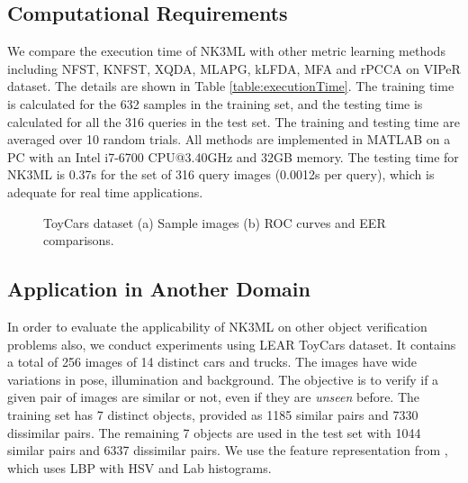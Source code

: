 \documentclass[runningheads]{llncs}
\begin{document}
\subsection{Computational Requirements}

We compare the execution time of
NK3ML with other metric learning methods including NFST\cite{Zheng:nfst}, KNFST\cite{Zheng:nfst}, XQDA\cite{LOMO,GOG},  MLAPG\cite{MLAPG}, kLFDA\cite{rPcca}, MFA\cite{rPcca} and rPCCA\cite{rPcca}  on VIPeR dataset. The details are shown in Table \ref{table:executionTime}. The training time is calculated for the 632 samples in the training set, and the testing time is calculated for all the 316 queries in the test set. The training and testing time are averaged over 10 random trials. All methods are implemented in MATLAB
on a PC with an Intel i7-6700 CPU@3.40GHz and 32GB memory. The testing time for NK3ML is 0.37s for the set of 316 query images (0.0012s per query), which is adequate for real time applications.


\begin{figure}[h]
\begin{center}
 \qquad
  \end{center}
  \caption{ToyCars dataset (a) Sample images (b) ROC curves and EER comparisons.}
  \label{fig:ToyCar}
\end{figure}

\subsection{ Application in Another Domain}
In order to evaluate the applicability of NK3ML on other object verification problems also, we conduct experiments using LEAR ToyCars \cite{ToyCarDataset} dataset. It contains a total of 256 images of 14 distinct cars and trucks. The images have wide variations in pose, illumination and background. The objective is to verify if a given pair of images are similar or not, even if they are \textit{unseen} before. The training set has 7 distinct objects, provided as 1185 similar pairs and 7330 dissimilar pairs. The remaining 7 objects are used in the test set with 1044 similar pairs and 6337 dissimilar pairs. We use  the feature representation from \cite{KISSME}, which uses LBP with HSV and Lab histograms.
\end{document}
